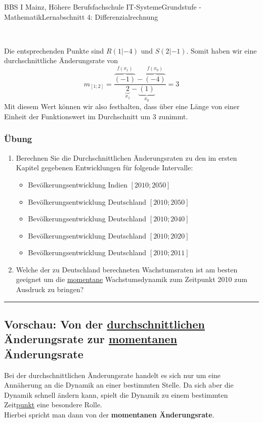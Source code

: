\documentclass[11pt,twocolumn,oneside,openany,headings=optiontotoc,11pt,numbers=noenddot,final]{article}
\begin{document}
\begin{worksheet}{BBS I Mainz, Höhere Berufsfachschule IT-Systeme}{Grundstufe - Mathematik}{Lernabschnitt 4: Differenzialrechnung}
\begin{minipage}{0.2\textwidth}
		\end{minipage}\\
		\par\noindent
		Die entsprechenden Punkte sind \(R(1|-4)\) und \(S(2|-1)\). Somit haben wir eine durchschnittliche Änderungsrate von
		\[m_{[1;2]} = \frac{\overbrace{(-1)}^{f(x_1)} - \overbrace{(-4)}^{f(x_0)}}{\underbrace{2}_{x_1} - \underbrace{(1)}_{x_0}} = 3\]
		Mit diesem Wert können wir also festhalten, dass über eine Länge von einer Einheit der Funktionswert im Durchschnitt um \(3\) zunimmt.\\
		\subsubsection{Übung}
		\begin{enumerate}
			\item Berechnen Sie die Durchschnittlichen Änderungsraten zu den im ersten Kapitel gegebenen Entwicklungen für folgende Intervalle:
			\begin{itemize}[label=-]
				\item Bevölkerungsentwicklung Indien \([2010;2050]\)
				\item Bevölkerungsentwicklung Deutschland \([2010;2050]\)
				\item Bevölkerungsentwicklung Deutschland \([2010;2040]\)
				\item Bevölkerungsentwicklung Deutschland \([2010;2020]\)
				\item Bevölkerungsentwicklung Deutschland \([2010;2011]\)
			\end{itemize}
			\item Welche der zu Deutschland berechneten Wachstumsraten ist am besten geeignet um die \underline{momentane} Wachstumsdynamik zum Zeitpunkt 2010 zum Ausdruck zu bringen?
		\end{enumerate}
		\rule{0.48\textwidth}{0.1pt}
		\subsection*{Vorschau: Von der \underline{durchschnittlichen} Änderungsrate zur \underline{momentanen} Änderungsrate}
		Bei der durchschnittlichen Änderungsrate handelt es sich nur um eine Annäherung an die Dynamik an einer bestimmten Stelle. Da sich aber die Dynamik schnell ändern kann, spielt die Dynamik zu einem bestimmten Zeit\underline{punkt} eine besondere Rolle.\\
		Hierbei spricht man dann von der \textbf{momentanen Änderungsrate}.

\end{worksheet}
\end{document}
